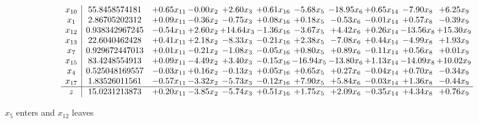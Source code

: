 \documentclass[9pt]{article}
\begin{document}
 \[\begin{array}{c| c c@{\hskip 2pt} c@{\hskip 2pt} c@{\hskip 2pt} c@{\hskip 2pt} c@{\hskip 2pt} c@{\hskip 2pt} c@{\hskip 2pt} c@{\hskip 2pt} c@{\hskip 2pt} }
 x_{10}   &  55.8458574181 & +  0.65 x_{11} & -0.00 x_{2} & +  2.60 x_{3} & +  0.61 x_{16} & -5.68 x_{5} & -18.95 x_{6} & +  0.65 x_{14} & -7.90 x_{8} & +  6.25 x_{9}\\
 x_{1}   &  2.86705202312 & +  0.09 x_{11} & -0.36 x_{2} & -0.75 x_{3} & +  0.08 x_{16} & +  0.18 x_{5} & -0.53 x_{6} & -0.01 x_{14} & +  0.57 x_{8} & -0.39 x_{9}\\
 x_{12}   &  0.938342967245 & -0.54 x_{11} & +  2.60 x_{2} & + 14.64 x_{3} & -1.36 x_{16} & -3.67 x_{5} & +  4.42 x_{6} & +  0.26 x_{14} & -13.56 x_{8} & + 15.30 x_{9}\\
 x_{13}   &  22.6040462428 & +  0.41 x_{11} & +  2.18 x_{2} & -8.33 x_{3} & -0.21 x_{16} & +  2.38 x_{5} & -7.08 x_{6} & +  0.44 x_{14} & -4.99 x_{8} & +  1.93 x_{9}\\
 x_{7}   &  0.929672447013 & +  0.01 x_{11} & -0.21 x_{2} & -1.08 x_{3} & -0.05 x_{16} & +  0.80 x_{5} & +  0.89 x_{6} & -0.11 x_{14} & +  0.56 x_{8} & +  0.01 x_{9}\\
 x_{15}   &  83.4248554913 & +  0.09 x_{11} & -4.49 x_{2} & +  3.40 x_{3} & -0.15 x_{16} & -16.94 x_{5} & -13.80 x_{6} & +  1.13 x_{14} & -14.09 x_{8} & + 10.02 x_{9}\\
 x_{4}   &  0.525048169557 & -0.03 x_{11} & +  0.16 x_{2} & -0.13 x_{3} & +  0.05 x_{16} & +  0.65 x_{5} & +  0.27 x_{6} & -0.04 x_{14} & +  0.70 x_{8} & -0.34 x_{9}\\
 x_{17}   &  1.83526011561 & -0.57 x_{11} & -3.32 x_{2} & -5.73 x_{3} & -0.12 x_{16} & +  7.90 x_{5} & +  5.84 x_{6} & -0.03 x_{14} & +  1.36 x_{8} & -0.44 x_{9}\\
\hline
z    &  15.0231213873 & +  0.20 x_{11} & -3.85 x_{2} & -5.74 x_{3} & +  0.51 x_{16} & +  1.75 x_{5} & +  2.09 x_{6} & -0.35 x_{14} & +  4.34 x_{8} & +  0.76 x_{9}\\
\end{array}\]


 $ x_{5} $ enters and $ x_{12} $ leaves 
\end{document}
